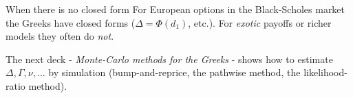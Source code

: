 \documentclass[pdf, handout]{beamer}
\begin{document}
\begin{frame}{When there is no closed form}
For European options in the Black-Scholes market the Greeks have closed forms ($\Delta=\Phi(d_1)$, etc.). For \emph{exotic} payoffs or richer models they often do \emph{not}.
\medskip

The next deck - \emph{Monte-Carlo methods for the Greeks} - shows how to estimate $\Delta,\Gamma,\nu,\dots$ by simulation (bump-and-reprice, the pathwise method, the likelihood-ratio method).
\end{frame}
\end{document}

